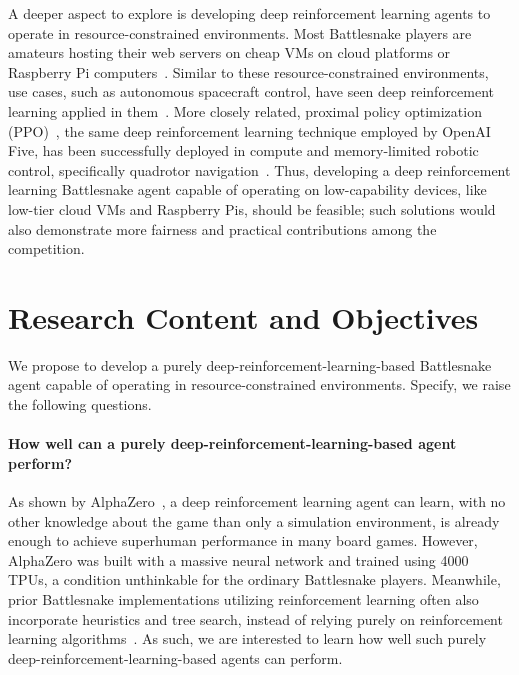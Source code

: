 \documentclass[a4paper]{article}
\newcommand{\todo}[1]{\textcolor{red}{[ #1 ]}}
\renewcommand{\todo}[1]{} %
\begin{document}
A deeper aspect to explore is developing deep reinforcement learning agents to
operate in resource-constrained environments.
Most Battlesnake players are amateurs hosting their web servers on cheap VMs on
cloud platforms or Raspberry Pi computers~\cite{standard_leaderboard}.
Similar to these resource-constrained environments, use cases,
such as autonomous spacecraft control,
have seen deep reinforcement learning applied in
them~\cite{harris2022generation}. More closely related,
proximal policy optimization (PPO)~\cite{schulman2017proximal},
the same deep reinforcement learning technique employed by OpenAI Five,
has been successfully deployed in compute and memory-limited robotic control,
specifically quadrotor navigation~\cite{huang2023collision,hegde2023hyperppo}.
Thus,
developing a deep reinforcement learning Battlesnake agent capable of operating
on low-capability devices, like low-tier cloud VMs and Raspberry Pis,
should be feasible;
such solutions would also demonstrate more fairness and practical contributions
among the competition.

\section{Research Content and Objectives}

\todo{and critical scientific problems to be solved}

We propose to develop a purely deep-reinforcement-learning-based Battlesnake
agent capable of operating in resource-constrained environments. Specify,
we raise the following questions.

\paragraph{How well can a purely deep-reinforcement-learning-based agent
    perform?
} As shown by AlphaZero~\cite{silver2017mastering},
a deep reinforcement learning agent can learn,
with no other knowledge about the game than only a simulation environment,
is already enough to achieve superhuman performance in many board games.
However,
AlphaZero was built with a massive neural network and trained using 4000 TPUs,
a condition unthinkable for the ordinary Battlesnake players. Meanwhile,
prior Battlesnake implementations utilizing reinforcement learning often also
incorporate heuristics and tree search,
instead of relying purely on reinforcement learning
algorithms~\cite{chung2020battlesnake,binnersley2020battlesnake}. As such,
we are interested to learn how well such purely
deep-reinforcement-learning-based agents can perform.
\end{document}
